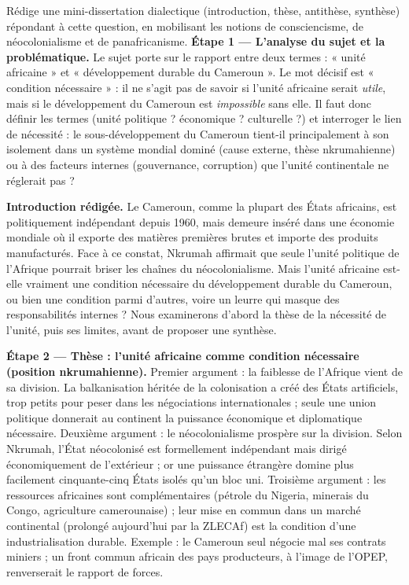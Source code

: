 \documentclass[11pt]{article}
\newcounter{popsec}
\newcounter{popsub}
\newcommand{\courssub}[1]{%
  \stepcounter{popsub}%
  \par\vspace{9pt}\noindent{\popxbold\fontsize{11.5}{13}\selectfont\color{popink}{\color{poporange}\thepopsec.\thepopsub}\hspace{6pt}#1}\par\nopagebreak\vspace{4pt}
}
\begin{document}
\courssub{Démarche et corrigé commenté}

\begin{exoresolu}
Rédige une mini-dissertation dialectique (introduction, thèse, antithèse, synthèse) répondant à cette question, en mobilisant les notions de consciencisme, de néocolonialisme et de panafricanisme.
\tcblower
\textbf{Étape 1 — L'analyse du sujet et la problématique.} Le sujet porte sur le rapport entre deux termes : « unité africaine » et « développement durable du Cameroun ». Le mot décisif est « condition nécessaire » : il ne s'agit pas de savoir si l'unité africaine serait \emph{utile}, mais si le développement du Cameroun est \emph{impossible} sans elle. Il faut donc définir les termes (unité politique ? économique ? culturelle ?) et interroger le lien de nécessité : le sous-développement du Cameroun tient-il principalement à son isolement dans un système mondial dominé (cause externe, thèse nkrumahienne) ou à des facteurs internes (gouvernance, corruption) que l'unité continentale ne réglerait pas ?

\textbf{Introduction rédigée.} Le Cameroun, comme la plupart des États africains, est politiquement indépendant depuis 1960, mais demeure inséré dans une économie mondiale où il exporte des matières premières brutes et importe des produits manufacturés. Face à ce constat, Nkrumah affirmait que seule l'unité politique de l'Afrique pourrait briser les chaînes du néocolonialisme. Mais l'unité africaine est-elle vraiment une condition nécessaire du développement durable du Cameroun, ou bien une condition parmi d'autres, voire un leurre qui masque des responsabilités internes ? Nous examinerons d'abord la thèse de la nécessité de l'unité, puis ses limites, avant de proposer une synthèse.

\textbf{Étape 2 — Thèse : l'unité africaine comme condition nécessaire (position nkrumahienne).} Premier argument : la faiblesse de l'Afrique vient de sa division. La balkanisation héritée de la colonisation a créé des États artificiels, trop petits pour peser dans les négociations internationales ; seule une union politique donnerait au continent la puissance économique et diplomatique nécessaire. Deuxième argument : le néocolonialisme prospère sur la division. Selon Nkrumah, l'État néocolonisé est formellement indépendant mais dirigé économiquement de l'extérieur ; or une puissance étrangère domine plus facilement cinquante-cinq États isolés qu'un bloc uni. Troisième argument : les ressources africaines sont complémentaires (pétrole du Nigeria, minerais du Congo, agriculture camerounaise) ; leur mise en commun dans un marché continental (prolongé aujourd'hui par la ZLECAf) est la condition d'une industrialisation durable. Exemple : le Cameroun seul négocie mal ses contrats miniers ; un front commun africain des pays producteurs, à l'image de l'OPEP, renverserait le rapport de forces.


\end{exoresolu}
\end{document}
